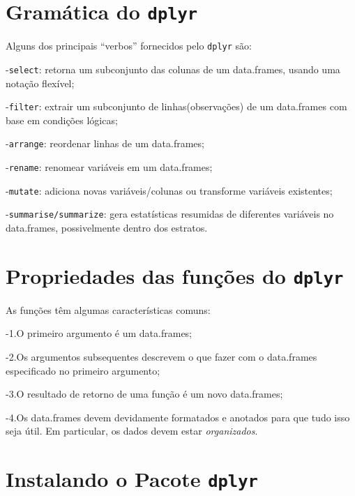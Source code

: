 \documentclass[]{book}
\begin{document}
\hypertarget{gramuxe1tica-do-dplyr}{%
\section{\texorpdfstring{Gramática do \texttt{dplyr}}{Gramática do dplyr}}\label{gramuxe1tica-do-dplyr}}

Alguns dos principais ``verbos'' fornecidos pelo \texttt{dplyr} são:

-\texttt{select}: retorna um subconjunto das colunas de um data.frames, usando uma notação flexível;

-\texttt{filter}: extrair um subconjunto de linhas(observações) de um data.frames com base em condições lógicas;

-\texttt{arrange}: reordenar linhas de um data.frames;

-\texttt{rename}: renomear variáveis em um data.frames;

-\texttt{mutate}: adiciona novas variáveis/colunas ou transforme variáveis existentes;

-\texttt{summarise/summarize}: gera estatísticas resumidas de diferentes variáveis no data.frames, possivelmente dentro dos estratos.

\hypertarget{propriedades-das-funuxe7uxf5es-do-dplyr}{%
\section{\texorpdfstring{Propriedades das funções do \texttt{dplyr}}{Propriedades das funções do dplyr}}\label{propriedades-das-funuxe7uxf5es-do-dplyr}}

As funções têm algumas características comuns:

-1.O primeiro argumento é um data.frames;

-2.Os argumentos subsequentes descrevem o que fazer com o data.frames especificado no primeiro argumento;

-3.O resultado de retorno de uma função é um novo data.frames;

-4.Os data.frames devem devidamente formatados e anotados para que tudo isso seja útil. Em particular, os dados devem estar \emph{organizados}.

\hypertarget{instalando-o-pacote-dplyr}{%
\section{\texorpdfstring{Instalando o Pacote \texttt{dplyr}}{Instalando o Pacote dplyr}}\label{instalando-o-pacote-dplyr}}
\end{document}
